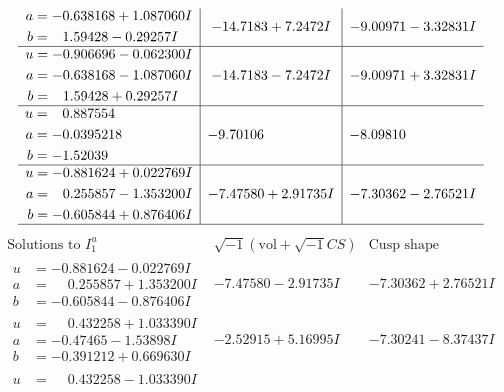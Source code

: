 \documentclass[1p]{elsarticle_modified}
\theoremstyle{definition}
\newcommand{\I}{\sqrt{-1}}
\begin{document}
$$\begin{array}{c|c|c}
\begin{aligned}
a &= -0.638168 + 1.087060 I \\
b &= \phantom{-}1.59428 - 0.29257 I\end{aligned}
 & -14.7183 + 7.2472 I & -9.00971 - 3.32831 I \\ \hline\begin{aligned}
u &= -0.906696 - 0.062300 I \\
a &= -0.638168 - 1.087060 I \\
b &= \phantom{-}1.59428 + 0.29257 I\end{aligned}
 & -14.7183 - 7.2472 I & -9.00971 + 3.32831 I \\ \hline\begin{aligned}
u &= \phantom{-}0.887554\phantom{ +0.000000I} \\
a &= -0.0395218\phantom{ +0.000000I} \\
b &= -1.52039\phantom{ +0.000000I}\end{aligned}
 & -9.70106\phantom{ +0.000000I} & -8.09810\phantom{ +0.000000I} \\ \hline\begin{aligned}
u &= -0.881624 + 0.022769 I \\
a &= \phantom{-}0.255857 - 1.353200 I \\
b &= -0.605844 + 0.876406 I\end{aligned}
 & -7.47580 + 2.91735 I & -7.30362 - 2.76521 I\\
 \hline 
 \end{array}$$\newpage$$\begin{array}{c|c|c}  
\text{Solutions to }I^u_{1}& \I (\text{vol} + \sqrt{-1}CS) & \text{Cusp shape}\\
 \hline 
\begin{aligned}
u &= -0.881624 - 0.022769 I \\
a &= \phantom{-}0.255857 + 1.353200 I \\
b &= -0.605844 - 0.876406 I\end{aligned}
 & -7.47580 - 2.91735 I & -7.30362 + 2.76521 I \\ \hline\begin{aligned}
u &= \phantom{-}0.432258 + 1.033390 I \\
a &= -0.47465 - 1.53898 I \\
b &= -0.391212 + 0.669630 I\end{aligned}
 & -2.52915 + 5.16995 I & -7.30241 - 8.37437 I \\ \hline\begin{aligned}
u &= \phantom{-}0.432258 - 1.033390 I \\

\end{aligned}
\end{array}$$
\end{document}
